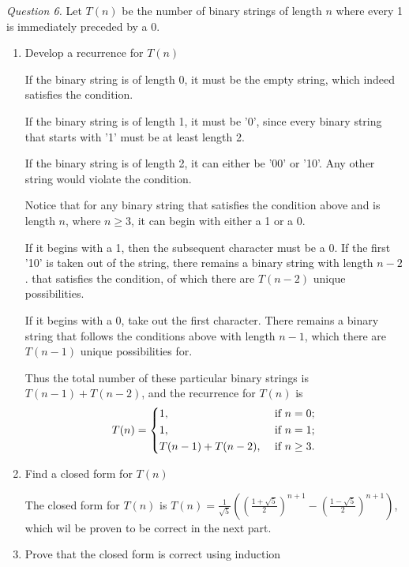 \documentclass[11pt]{article}
\begin{document}
    \textit{Question 6.} Let \(T(n)\) be the number of binary strings of length \(n\) where every 1 is immediately preceded by a 0.
    \begin{enumerate}[label=(\alph*)]
        \item Develop a recurrence for \(T(n)\)
        
        If the binary string is of length 0, it must be the empty string, which indeed satisfies the condition.
        
        If the binary string is of length 1, it must be '0', since every binary string that starts with '1' must be at least length 2.

        If the binary string is of length 2, it can either be '00' or '10'. Any other string would violate the condition.

        Notice that for any binary string that satisfies the condition above and is length \(n\), where \(n\geq 3\), it can begin with either a 1 or a 0.

        If it begins with a 1, then the subsequent character must be a 0. If the first '10' is taken out of the string, there remains a binary string with length \(n-2\). that satisfies the condition, of which there are \(T(n-2)\) unique possibilities.

        If it begins with a 0, take out the first character. There remains a binary string that follows the conditions above with length \(n-1\), which there are \(T(n-1)\) unique possibilities for.

        Thus the total number of these particular binary strings is \(T(n-1) + T(n-2)\), and the recurrence for \(T(n)\) is
        \[
            T(n)=\begin{dcases}
                1, &\text{ if } n=0 ;\\
                1, &\text{ if } n=1 ;\\
                T(n-1) + T(n-2), &\text{ if } n\geq 3.
            \end{dcases}
        \]

        \item Find a closed form for \(T(n)\) 
        
        The closed form for \(T(n)\) is \(T(n)=\frac{1}{\sqrt{5}}\left(\left(\frac{1+\sqrt{5}}{2}\right)^{n+1} - \left(\frac{1-\sqrt{5}}{2}\right)^{n+1}\right)\), which wil be proven to be correct in the next part.

        \item Prove that the closed form is correct using induction
        

\end{enumerate}
\end{document}
